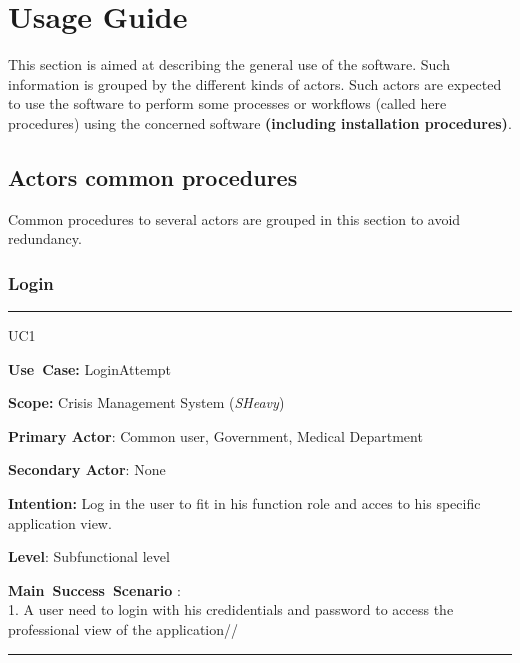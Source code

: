 \chapter{Usage Guide}
\label{chap:usage_guide}

This section is aimed at describing the general use of the software. Such
information is grouped by the different kinds of actors.
Such actors are expected to use the software to perform some
processes or workflows (called here procedures) using the concerned software
\textbf{(including installation procedures)}.

\section{Actors common procedures}
Common procedures to several actors are grouped in this section to avoid
redundancy.

\subsection{Login}
\vspace{0.5cm} 
\hrule
\vspace{0.5cm}
\begin{lyxlist}{UC1}
\small{
\item [\textbf{Use~Case:}] LoginAttempt
\item [\textbf{Scope:}] Crisis Management System (\emph{SHeavy})
\item [\textbf{Primary Actor}:] Common user, Government, Medical Department
\item [\textbf{Secondary Actor}:] None
\item [\textbf{Intention:}] Log in the user to fit in his function role and
acces to his specific application view.
\item [\textbf{Level}:]Subfunctional level
\item [\textbf{Main~Success~Scenario}]:\\
1. A user need to login with his credidentials and password to access the
professional view of the application// 
}
\end{lyxlist}
\hrule 
\vspace{0.5cm} 

